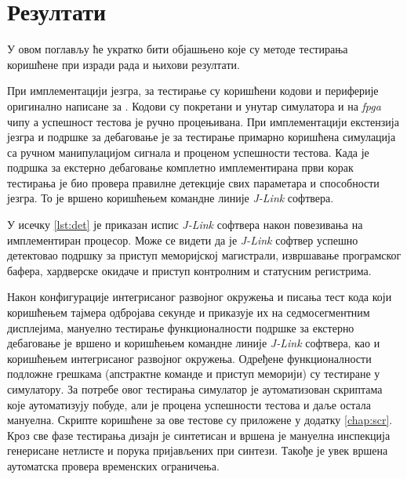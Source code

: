 \chapter{Резултати}

У овом поглављу ће укратко бити објашњено које су методе тестирања коришћене при изради рада и њихови резултати.

При имплементацији језгра, за тестирање су коришћени кодови и периферије оригинално написане за \cite{arilla}. Кодови су покретани и унутар симулатора и на \textit{\acrshort{fpga}} чипу а успешност тестова је ручно процењивана.
При имплементацији екстензија језгра и подршке за дебаговање је за тестирање примарно коришћена симулација са ручном манипулацијом сигнала и проценом успешности тестова.
Када је подршка за екстерно дебаговање комплетно имплементирана први корак тестирања је био провера правилне детекције свих параметара и способности језгра. То је вршено коришћењем командне линије \textit{J-Link} софтвера.



У исечку \ref{lst:det} је приказан испис \textit{J-Link} софтвера након повезивања на имплементиран процесор. Може се видети да је \textit{J-Link} софтвер успешно детектовао подршку за приступ меморијској магистрали, извршавање програмског бафера, хардверске окидаче и приступ контролним и статусним регистрима. \newpage

Након конфигурације интегрисаног развојног окружења и писања тест кода који коришћењем тајмера одбројава секунде и приказује их на седмосегментним дисплејима, мануелно тестирање функционалности подршке за екстерно дебаговање је вршено и коришћењем командне линије \textit{J-Link} софтвера, као и коришћењем интегрисаног развојног окружења.
Одређене функционалности подложне грешкама (апстрактне команде и приступ меморији) су тестиране у симулатору. За потребе овог тестирања симулатор је аутоматизован скриптама које аутоматизују побуде, али је процена успешности тестова и даље остала мануелна. Скрипте коришћене за ове тестове су приложене у додатку \ref{chap:scr}.
Кроз све фазе тестирања дизајн је синтетисан и вршена је мануелна инспекција генерисане нетлисте и порука пријављених при синтези. Такође је увек вршена аутоматска провера временских ограничења.


